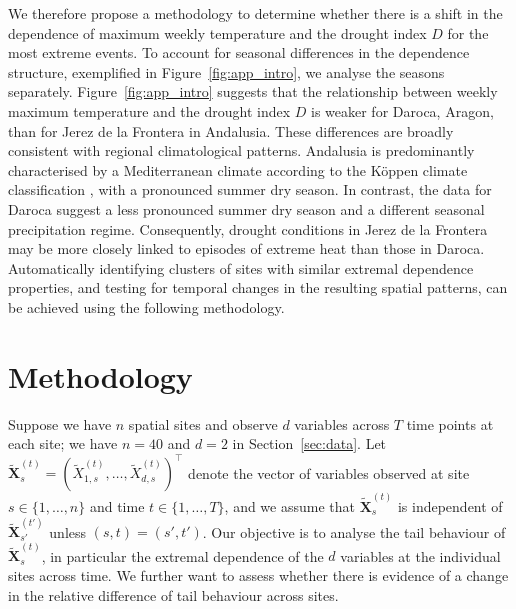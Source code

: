 \documentclass[APA,STIX1COL]{WileyNJD-v2}
\begin{document}
We therefore propose a methodology to determine whether there is a shift in the dependence of maximum weekly temperature and the drought index $D$ for the most extreme events. 
To account for seasonal differences in the dependence structure, exemplified in Figure~\ref{fig:app_intro}, we analyse the seasons separately. 
Figure~\ref{fig:app_intro} suggests that the relationship between weekly maximum temperature and the drought index $D$ is weaker for Daroca, Aragon, than for Jerez de la Frontera in Andalusia. 
These differences are broadly consistent with regional climatological patterns.
Andalusia is predominantly characterised by a Mediterranean climate according to the K{\"o}ppen climate classification \citep{Peel2007}, with a pronounced summer dry season. 
In contrast, the data for Daroca suggest a less pronounced summer dry season and a different seasonal precipitation regime. 
Consequently, drought conditions in Jerez de la Frontera may be more closely linked to episodes of extreme heat than those in Daroca.
Automatically identifying clusters of sites with similar extremal dependence properties, and testing for temporal changes in the resulting spatial patterns, can be achieved using the following methodology. 


\section{Methodology}\label{sec:method}

Suppose we have $n$ spatial sites and observe $d$ variables across $T$ time points at each site; we have $n=40$ and $d=2$ in Section~\ref{sec:data}. Let $\tilde{\boldsymbol{X}}_{s}^{(t)}=(\tilde{X}_{1,s}^{(t)}, \ldots,\tilde{X}_{d,s}^{(t)})^\top$ denote the vector of variables observed at site $s\in\{1,\ldots,n\}$ and time $t\in\{1,\ldots,T\}$, and we assume that $\tilde{\boldsymbol{X}}_{s}^{(t)}$ is independent of $\tilde{\boldsymbol{X}}_{s'}^{(t')}$ unless $(s,t)=(s',t')$. Our objective is to analyse the tail behaviour of $\tilde{\boldsymbol{X}}_s^{(t)}$, in particular the extremal dependence of the $d$ variables at the individual sites across time. We further want to assess whether there is evidence of a change in the relative difference of tail behaviour across sites.
\end{document}
